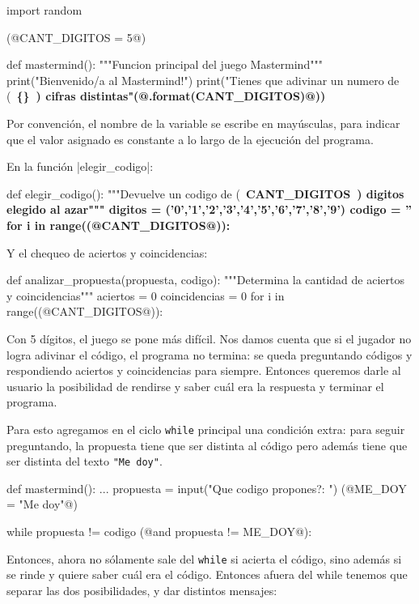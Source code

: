 \begin{enumerate}
\begin{codigo-python-sn}
import random

(@CANT_DIGITOS = 5@)

def mastermind():
    """Funcion principal del juego Mastermind"""
    print("Bienvenido/a al Mastermind!")
    print("Tienes que adivinar un numero de (~\bfseries{\{\}}~) cifras distintas"(@.format(CANT_DIGITOS)@))
\end{codigo-python-sn}

Por convención, el nombre de la variable se escribe en mayúsculas, para indicar
que el valor asignado es constante a lo largo de la ejecución del programa.

En la función |elegir_codigo|:

\begin{codigo-python-sn}
def elegir_codigo():
    """Devuelve un codigo de (~\bfseries{CANT\_DIGITOS}~) digitos elegido al azar"""
    digitos = ('0','1','2','3','4','5','6','7','8','9')
    codigo = ''
    for i in range((@CANT_DIGITOS@)):
\end{codigo-python-sn}

Y el chequeo de aciertos y coincidencias:

\begin{codigo-python-sn}
def analizar_propuesta(propuesta, codigo):
    """Determina la cantidad de aciertos y coincidencias"""
    aciertos = 0
    coincidencias = 0
    for i in range((@CANT_DIGITOS@)):
\end{codigo-python-sn}

Con 5 dígitos, el juego se pone más difícil. Nos damos cuenta que si el jugador
no logra adivinar el código, el programa no termina: se queda preguntando
códigos y respondiendo aciertos y coincidencias para siempre. Entonces queremos
darle al usuario la posibilidad de rendirse y saber cuál era la respuesta y
terminar el programa.

Para esto agregamos en el ciclo \lstinline!while! principal una condición
extra: para seguir preguntando, la propuesta tiene que ser distinta al
código pero además tiene que ser distinta del texto \lstinline!"Me doy"!.

\begin{codigo-python-sn}
def mastermind():
    ...
    propuesta = input("Que codigo propones?: ")
    (@ME_DOY = "Me doy"@)

    while propuesta != codigo (@and propuesta != ME_DOY@):
\end{codigo-python-sn}

Entonces, ahora no sólamente sale del \lstinline!while! si acierta el
código, sino además si se rinde y quiere saber cuál era el código. Entonces
afuera del while tenemos que separar las dos posibilidades, y dar distintos
mensajes:


\end{enumerate}
